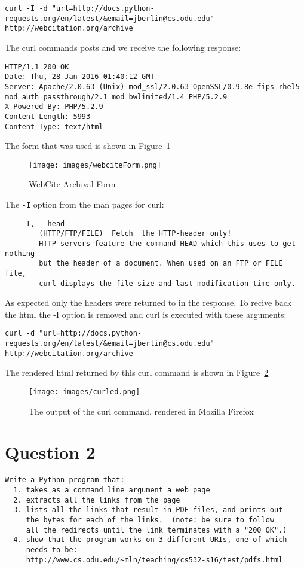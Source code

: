 \documentclass[letterpaper,10pt]{article}
\begin{document}
\begin{lstlisting}[frame=single]
curl -I -d "url=http://docs.python-requests.org/en/latest/&email=jberlin@cs.odu.edu"  http://webcitation.org/archive
\end{lstlisting}
The curl commands posts and we receive the following response:

\begin{lstlisting}[frame=single]
HTTP/1.1 200 OK
Date: Thu, 28 Jan 2016 01:40:12 GMT
Server: Apache/2.0.63 (Unix) mod_ssl/2.0.63 OpenSSL/0.9.8e-fips-rhel5 mod_auth_passthrough/2.1 mod_bwlimited/1.4 PHP/5.2.9
X-Powered-By: PHP/5.2.9
Content-Length: 5993
Content-Type: text/html
\end{lstlisting}
The form that was used is shown in Figure~\ref{fig:webciteForm}
\begin{figure}
\centering
\texttt{[image: images/webciteForm.png]}
\caption{WebCite Archival Form}
\label{fig:webciteForm}
\end{figure}
\newpage
The \verb+-I+ option from the man pages for curl:
\begin{verbatim}
    -I, --head
        (HTTP/FTP/FILE)  Fetch  the HTTP-header only! 
        HTTP-servers feature the command HEAD which this uses to get nothing 
        but the header of a document. When used on an FTP or FILE file, 
        curl displays the file size and last modification time only.
\end{verbatim}
As expected only the headers were returned to in the response. To recive back the html the -I option is removed and curl is executed with these arguments:
\begin{lstlisting}[frame=single]
curl -d "url=http://docs.python-requests.org/en/latest/&email=jberlin@cs.odu.edu"  http://webcitation.org/archive
\end{lstlisting}
\noindent
The rendered html returned by this curl command is shown in Figure~\ref{fig:curled}
\begin{figure}[!ht]
\texttt{[image: images/curled.png]}
\caption{The output of the curl command, rendered in Mozilla Firefox}
\label{fig:curled}
\end{figure}

\newpage
\section*{Question 2}

\begin{verbatim}
Write a Python program that:
  1. takes as a command line argument a web page
  2. extracts all the links from the page
  3. lists all the links that result in PDF files, and prints out
     the bytes for each of the links.  (note: be sure to follow
     all the redirects until the link terminates with a "200 OK".)
  4. show that the program works on 3 different URIs, one of which
     needs to be: 
     http://www.cs.odu.edu/~mln/teaching/cs532-s16/test/pdfs.html
\end{verbatim}
\end{document}
